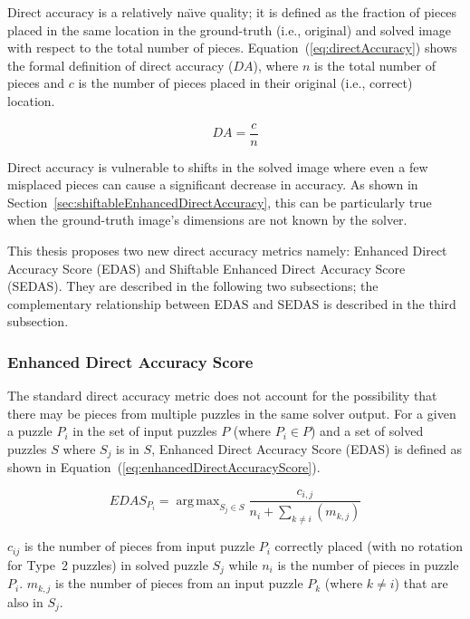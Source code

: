\documentclass{report}
\def\eref#1{(\ref{#1})}
\DeclareMathOperator*{\argmax}{arg\,max} %
\begin{document}
Direct accuracy is a relatively na\"{\i}ve quality; it is defined as the fraction of pieces placed in the same location in the ground-truth (i.e., original) and solved image with respect to the total number of pieces.  Equation~\eref{eq:directAccuracy} shows the formal definition of direct accuracy ($DA$), where $n$ is the total number of pieces and $c$ is the number of pieces placed in their original (i.e., correct) location.

\begin{equation} \label{eq:directAccuracy}
DA = \frac{c}{n}
\end{equation}

Direct accuracy is vulnerable to shifts in the solved image where even a few misplaced pieces can cause a significant decrease in accuracy.  As shown in Section~\ref{sec:shiftableEnhancedDirectAccuracy}, this can be particularly true when the ground-truth image's dimensions are not known by the solver.

This thesis proposes two new direct accuracy metrics namely: Enhanced Direct Accuracy Score (EDAS) and Shiftable Enhanced Direct Accuracy Score (SEDAS).  They are described in the following two subsections; the complementary relationship between EDAS and SEDAS is described in the third subsection.

\subsubsection{Enhanced Direct Accuracy Score}\label{sec:enhancedDirectAccuracyScore}

The standard direct accuracy metric does not account for the possibility that there may be pieces from multiple puzzles in the same solver output.  For a given a puzzle $P_i$ in the set of input puzzles $P$ (where $P_i \in P$) and a set of solved puzzles $S$ where $S_j$ is in $S$, Enhanced Direct Accuracy Score (EDAS) is defined as shown in Equation~\eref{eq:enhancedDirectAccuracyScore}.

\begin{equation} \label{eq:enhancedDirectAccuracyScore}
EDAS_{P_i} = \argmax_{S_j \in S}\frac{c_{i,j}}{n_i + \sum_{k \ne i}(m_{k,j})}
\end{equation}

\noindent
$c_{ij}$ is the number of pieces from input puzzle $P_i$ correctly placed (with no rotation for Type~2 puzzles) in solved puzzle $S_j$ while $n_i$ is the number of pieces in puzzle $P_i$. $m_{k,j}$ is the number of pieces from an input puzzle $P_k$ (where $k \ne i$) that are also in $S_j$.
\end{document}
